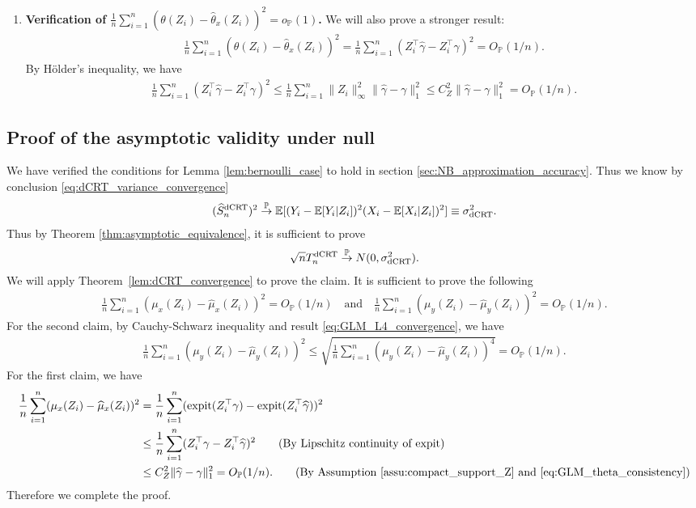 \documentclass[12pt]{article}
\theoremstyle{definition}
\def\P{\mathbb{P}}
\def\P{\mathbb{P}}
\newcommand{\E}{\mathbb E}								%
\renewcommand{\P}{\mathbb{P}}							%
\newcommand{\expit}{\mathrm{expit}}                 	%
\newcommand{\convp}{\overset{\mathbb{P}}{\rightarrow}}             %
\newcommand{\srx}{X}									%
\newcommand{\srz}{Z}									%
\newcommand{\sry}{Y}									%
\newcommand{\dCRT}{\textnormal{dCRT}} 					%
\begin{document}
\begin{enumerate}
\item \textbf{Verification of $\frac{1}{n}\sum_{i=1}^n (\theta(\srz_{i})-\widehat \theta_{x}(\srz_{i}))^{2}=o_{\P}(1)$.} We will also prove a stronger result:
\begin{align*}
  \frac{1}{n}\sum_{i=1}^n (\theta(\srz_{i})-\widehat \theta_{x}(\srz_{i}))^{2}=\frac{1}{n}\sum_{i=1}^n (\srz_i^\top\widehat{\gamma}-\srz_i^\top\gamma)^{2}=O_{\P}(1/n).
\end{align*}
By H\"older's inequality, we have 
\begin{align*}
  \frac{1}{n}\sum_{i=1}^n (\srz_i^\top\widehat{\gamma}-\srz_i^\top\gamma)^{2}\leq \frac{1}{n}\sum_{i=1}^n\|\srz_i\|_{\infty}^2\|\widehat{\gamma}-\gamma\|_1^2\leq C_Z^2\|\widehat{\gamma}-\gamma\|_1^2=O_{\P}(1/n).
\end{align*}
\end{enumerate}


\subsection{Proof of the asymptotic validity under null}

We have verified the conditions for Lemma \ref{lem:bernoulli_case} to hold in section \ref{sec:NB_approximation_accuracy}. Thus we know by conclusion \eqref{eq:dCRT_variance_convergence}
\begin{align*}
  (\widehat{S}_n^{\dCRT})^2\convp \E[(\sry_{i}-\E[\sry_i|\srz_i])^2(\srx_{i}-\E[\srx_i|\srz_i])^2]\equiv \sigma_{\dCRT}^2.
\end{align*}
Thus by Theorem \ref{thm:asymptotic_equivalence}, it is sufficient to prove 
\begin{align*}
  \sqrt{n}T_n^{\dCRT}\convp N(0,\sigma_{\dCRT}^2).
\end{align*}
We will apply Theorem~\ref{lem:dCRT_convergence} to prove the claim. It is sufficient to prove the following
\begin{align*}
  \frac{1}{n}\sum_{i=1}^n(\mu_x(\srz_i)-\widehat{\mu}_x(\srz_i))^2=O_\P(1/n)\quad\text{and}\quad\frac{1}{n}\sum_{i=1}^n(\mu_y(\srz_i)-\widehat{\mu}_y(\srz_i))^2=O_\P(1/n).
\end{align*}
For the second claim, by Cauchy-Schwarz inequality and result \eqref{eq:GLM_L4_convergence}, we have
\begin{align*}
  \frac{1}{n}\sum_{i=1}^n(\mu_y(\srz_i)-\widehat{\mu}_y(\srz_i))^2\leq\sqrt{\frac{1}{n}\sum_{i=1}^n(\mu_y(\srz_i)-\widehat{\mu}_y(\srz_i))^4}=O_{\P}(1/n).
\end{align*}
For the first claim, we have 
\begin{align*}
  \frac{1}{n}\sum_{i=1}^n(\mu_x(\srz_i)-\widehat{\mu}_x(\srz_i))^2
  &
  =\frac{1}{n}\sum_{i=1}^n(\expit(\srz_i^\top\gamma)-\expit(\srz_i^\top\widehat\gamma))^2\\
  &
  \leq \frac{1}{n}\sum_{i=1}^n(\srz_i^\top\gamma-\srz_i^\top\widehat\gamma)^2\tag{By Lipschitz continuity of $\expit$}\\
  &
  \leq C_Z^2\|\widehat{\gamma}-\gamma\|_1^2=O_{\P}(1/n).\tag{By Assumption \ref{assu:compact_support_Z} and \eqref{eq:GLM_theta_consistency}}
\end{align*}
Therefore we complete the proof.
\end{document}

